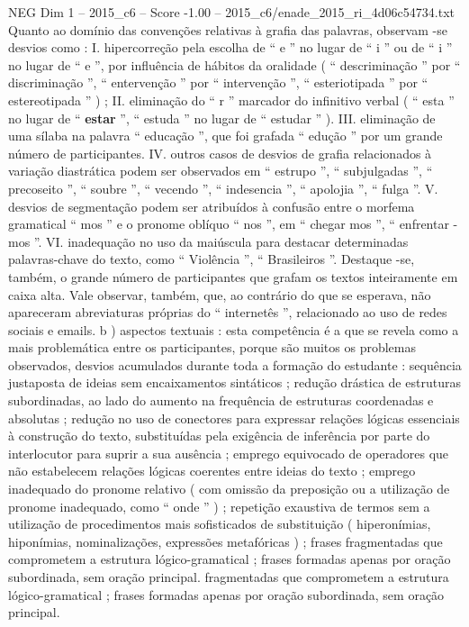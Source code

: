 \begin{textsample}{NEG Dim 1 – 2015\_c6 – Score -1.00 – 2015\_c6/enade\_2015\_ri\_4d06c54734.txt}
Quanto ao domínio das convenções relativas à grafia das palavras, observam -se desvios como : I. hipercorreção pela escolha de “ e ” no lugar de “ i ” ou de “ i ” no lugar de “ e ”, por influência de hábitos da oralidade ( “ descriminação ” por “ discriminação ”, “ entervenção ” por “ intervenção ”, “ esteriotipada ” por “ estereotipada ” ) ; II. eliminação do “ r ” marcador do infinitivo verbal ( “ esta ” no lugar de “ \textbf{estar} ”, “ estuda ” no lugar de “ estudar ” ).
III. eliminação de uma sílaba na palavra “ educação ”, que foi grafada “ edução ” por um grande número de participantes.
IV. outros casos de desvios de grafia relacionados à variação diastrática podem ser observados em “ estrupo ”, “ subjulgadas ”, “ precoseito ”, “ soubre ”, “ vecendo ”, “ indesencia ”, “ apolojia ”, “ fulga ”.
V. desvios de segmentação podem ser atribuídos à confusão entre o morfema gramatical “ mos ” e o pronome oblíquo “ nos ”, em “ chegar mos ”, “ enfrentar -mos ”.
VI. inadequação no uso da maiúscula para destacar determinadas palavras-chave do texto, como “ Violência ”, “ Brasileiros ”.
Destaque -se, também, o grande número de participantes que grafam os textos inteiramente em caixa alta.
Vale observar, também, que, ao contrário do que se esperava, não apareceram abreviaturas próprias do “ internetês ”, relacionado ao uso de redes sociais e emails. b ) aspectos textuais : esta competência é a que se revela como a mais problemática entre os participantes, porque são muitos os problemas observados, desvios acumulados durante toda a formação do estudante : sequência justaposta de ideias sem encaixamentos sintáticos ; redução drástica de estruturas subordinadas, ao lado do aumento na frequência de estruturas coordenadas e absolutas ; redução no uso de conectores para expressar relações lógicas essenciais à construção do texto, substituídas pela exigência de inferência por parte do interlocutor para suprir a sua ausência ; emprego equivocado de operadores que não estabelecem relações lógicas coerentes entre ideias do texto ; emprego inadequado do pronome relativo ( com omissão da preposição ou a utilização de pronome inadequado, como “ onde ” ) ; repetição exaustiva de termos sem a utilização de procedimentos mais sofisticados de substituição ( hiperonímias, hiponímias, nominalizações, expressões metafóricas ) ; frases fragmentadas que comprometem a estrutura lógico-gramatical ; frases formadas apenas por oração subordinada, sem oração principal. fragmentadas que comprometem a estrutura lógico-gramatical ; frases formadas apenas por oração subordinada, sem oração principal.

\end{textsample}
